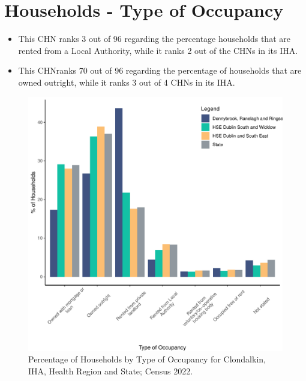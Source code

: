 \documentclass{article}
\begin{document}
\section{Households - Type of Occupancy}\label{sect:Households}
\begin{itemize}
\item This CHN ranks  3 out of 96 regarding the percentage households that are rented from a Local Authority, while it ranks  2 out of the CHNs in its IHA. 
\item This CHNranks  70 out of 96 regarding the percentage of households that are owned outright, while it ranks   3 out of 4 CHNs in its IHA.
\end{itemize}
\begin{figure}[H]
	\centering
	\includegraphics[width = 140mm]{../figures/HouseholdsED.pdf}
	\caption{Percentage of Households by Type of Occupancy for Clondalkin, IHA, Health Region and State; Census 2022.}
	\label{fig:vbnv}
	\end{figure}
\end{document}
